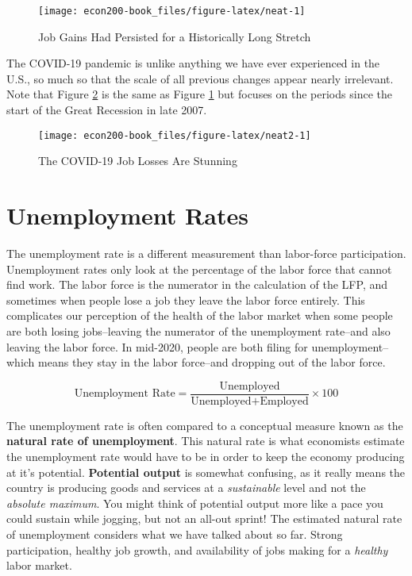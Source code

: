 \documentclass[
]{book}
\begin{document}
\begin{figure}

{\centering \texttt{[image: econ200-book\_files/figure-latex/neat-1]} 

}

\caption{Job Gains Had Persisted for a Historically Long Stretch}\label{fig:neat}
\end{figure}

The COVID-19 pandemic is unlike anything we have ever experienced in the U.S., so much so that the scale of all previous changes appear nearly irrelevant. Note that Figure \ref{fig:neat2} is the same as Figure \ref{fig:neat} but focuses on the periods since the start of the Great Recession in late 2007.

\begin{figure}

{\centering \texttt{[image: econ200-book\_files/figure-latex/neat2-1]} 

}

\caption{The COVID-19 Job Losses Are Stunning}\label{fig:neat2}
\end{figure}

\hypertarget{unemployment-rates}{%
\section{Unemployment Rates}\label{unemployment-rates}}

The unemployment rate is a different measurement than labor-force participation. Unemployment rates only look at the percentage of the labor force that cannot find work. The labor force is the numerator in the calculation of the LFP, and sometimes when people lose a job they leave the labor force entirely. This complicates our perception of the health of the labor market when some people are both losing jobs--leaving the numerator of the unemployment rate--and also leaving the labor force. In mid-2020, people are both filing for unemployment--which means they stay in the labor force--and dropping out of the labor force.

\[ \text{Unemployment Rate} = \frac{\text{Unemployed}}{\text{Unemployed} + \text{Employed}} \times 100 \]

The unemployment rate is often compared to a conceptual measure known as the \textbf{natural rate of unemployment}. This natural rate is what economists estimate the unemployment rate would have to be in order to keep the economy producing at it's potential. \textbf{Potential output} is somewhat confusing, as it really means the country is producing goods and services at a \emph{sustainable} level and not the \emph{absolute maximum}. You might think of potential output more like a pace you could sustain while jogging, but not an all-out sprint! The estimated natural rate of unemployment considers what we have talked about so far. Strong participation, healthy job growth, and availability of jobs making for a \emph{healthy} labor market.
\end{document}
